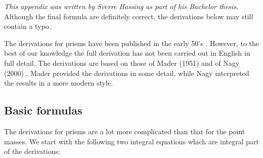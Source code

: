 
{\sl This appendix was written by Sverre Hassing as part of his Bachelor thesis.} 
Although the final formula are definitely correct, the derivations below may still contain a typo. 

\vspace{.4cm}

The derivations for prisms have been published in the early 50's \cite{made51}. 
However, to the best of our knowledge the full derivation has not been carried out in English in full detail. 
The derivations are based on those of Mader (1951) \cite{made51} and of Nagy \etal (2000) \cite{napb00,napb02}. 
Mader provided the derivations in some detail, while Nagy \etal interpreted the results in a more modern style. 


\subsection{Basic formulas}

The derivations for prisms are a lot more complicated than that for the point masses. 
We start with the following two integral equations which are integral part of the derivations:

